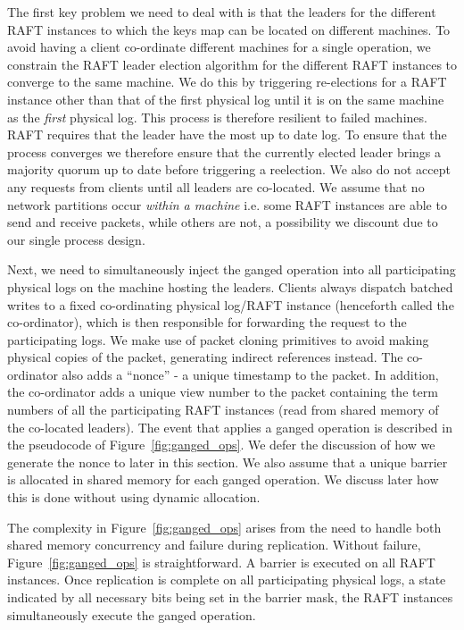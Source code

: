 \documentclass[pageno]{jpaper}
\begin{document}
The first key problem we need to deal with is that the leaders for the different
RAFT instances to which the keys map can be located on different machines. To
avoid having a client co-ordinate different machines for a single operation, we
constrain the RAFT leader election algorithm for the different RAFT instances to
converge to the same machine. We do this by triggering re-elections for a RAFT
instance other than that of the first physical log until it is on the same
machine as the \emph{first} physical log. This process is therefore resilient to
failed machines. RAFT requires that the leader have the most up to date log. To
ensure that the process converges we therefore ensure that the currently elected
leader brings a majority quorum up to date before triggering a reelection. We
also do not accept any requests from clients until all leaders are
co-located. We assume that no network partitions occur \emph{within a machine}
i.e. some RAFT instances are able to send and receive packets, while others are
not, a possibility we discount due to our single process design.

Next, we need to simultaneously inject the ganged operation into all
participating physical logs on the machine hosting the leaders. Clients always
dispatch batched writes to a fixed co-ordinating physical log/RAFT instance
(henceforth called the co-ordinator), which is then responsible for forwarding
the request to the participating logs. We make use of packet cloning primitives
to avoid making physical copies of the packet, generating indirect references
instead. The co-ordinator also adds a ``nonce'' - a unique timestamp to the
packet. In addition, the co-ordinator adds a unique view number to the packet
containing the term numbers of all the participating RAFT instances (read from
shared memory of the co-located leaders).  The event that applies a ganged
operation is described in the pseudocode of Figure~\ref{fig:ganged_ops}. We
defer the discussion of how we generate the nonce to later in this section. We
also assume that a unique barrier is allocated in shared memory for each ganged
operation. We discuss later how this is done without using dynamic allocation.

The complexity in Figure~\ref{fig:ganged_ops} arises from the need to handle
both shared memory concurrency and failure during replication. Without failure,
Figure~\ref{fig:ganged_ops} is straightforward. A barrier is executed on all
RAFT instances. Once replication is complete on all participating physical logs,
a state indicated by all necessary bits being set in the barrier mask, the RAFT
instances simultaneously execute the ganged operation.
\end{document}
